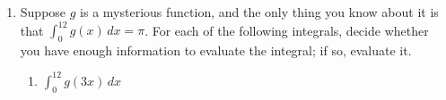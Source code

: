 \documentclass[main]{subfiles}
\begin{document}
\begin{enumerate}
\begin{enumerate}
    \begin{solution}
      Since there are 5 ants at 10 am (which is $t = 0$), the number of
      ants at 1 pm ($t = 3$) is
      \begin{align*}
        5 + \int_0^3 100 e^{-0.2t}\,dt &= 5 + \left( -500
          e^{-0.2t} \Big|_0^3 \right) \\
        &= \boxed{5 - 500 e^{-0.6} + 500}
      \end{align*}
    \end{solution}

  \item
    \begin{problem}[\vfill]
      How many ants are in the basket $x$ hours after 10 am?
    \end{problem}

    \begin{solution}
      Using exactly the same idea as in the previous part, the number of
      ants $x$ hours after 10 am is
      \begin{align*}
        5 + \int_0^x 100 e^{-0.2t}\,dt &= 5 + \left( -500
          e^{-0.2t} \Big|_0^x \right) \\
        &= \boxed{5 - 500 e^{-0.2 x} + 500}
      \end{align*}
    \end{solution}

  \end{enumerate}

\pspace{\newpage}

\item 

  Suppose $g$ is a mysterious function, and the only thing you know
  about it is that $\displaystyle \int_0^{12} g(x)\,dx = \pi$.  For each
  of the following integrals, decide whether you have enough information
  to evaluate the integral; if so, evaluate it.
  \probonly{}
    \begin{enumerate}
    \item
      \begin{problem}[\stretch{0.3}]
        $\displaystyle \int_0^{12} g(3x)\,dx$
      \end{problem}


\end{enumerate}
\end{enumerate}
\end{document}
